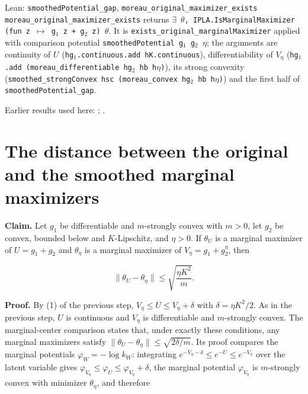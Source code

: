\documentclass[11pt,a4paper]{article}
\begin{document}
\begin{leanbox}{Lean: \texttt{smoothedPotential\_\allowbreak{}gap}, \texttt{moreau\_\allowbreak{}original\_\allowbreak{}maximizer\_\allowbreak{}exists}}
\texttt{moreau\_\allowbreak{}original\_\allowbreak{}maximizer\_\allowbreak{}exists} returns \texttt{\ensuremath{\exists} \ensuremath{\theta}, IPLA.\allowbreak{}Is\allowbreak{}Marginal\allowbreak{}Maximizer (fun z \ensuremath{\mapsto} g\ensuremath{{}_{1}} z + g\ensuremath{{}_{2}} z) \ensuremath{\theta}}. It is \texttt{exists\_\allowbreak{}original\_\allowbreak{}marginal\allowbreak{}Maximizer} applied with comparison potential \texttt{smoothed\allowbreak{}Potential g\ensuremath{{}_{1}} g\ensuremath{{}_{2}} \ensuremath{\eta}}; the arguments are continuity of \(U\) (\texttt{hg\ensuremath{{}_{1}}.\allowbreak{}continuous.\allowbreak{}add h\allowbreak{}K.\allowbreak{}continuous}), differentiability of \(V_\eta\) (\texttt{hg\ensuremath{{}_{1}}.\allowbreak{}add (moreau\_\allowbreak{}differentiable hg\ensuremath{{}_{2}} hb h\ensuremath{\eta})}), its strong convexity (\texttt{smoothed\_\allowbreak{}strong\allowbreak{}Convex hsc (moreau\_\allowbreak{}convex hg\ensuremath{{}_{2}} hb h\ensuremath{\eta})}) and the first half of \texttt{smoothed\allowbreak{}Potential\_\allowbreak{}gap}.
\end{leanbox}


Earlier results used here: \cite[Section~3.1.1]{LangevinLean2026IPLA}; \cite[Section~3.3.1]{LangevinLean2026IPLA}.

\section{\texorpdfstring{The distance between the original and the smoothed marginal maximizers}{The distance between the original and the smoothed marginal maximizers}}


\textbf{Claim.} Let \(g_1\) be differentiable and \(m\)-strongly convex with \(m>0\), let \(g_2\) be convex, bounded below and \(K\)-Lipschitz, and \(\eta>0\). If \(\theta_U\) is a marginal maximizer of \(U=g_1+g_2\) and \(\theta_\eta\) is a marginal maximizer of \(V_\eta=g_1+g_2^\eta\), then


\[\|\theta_U-\theta_\eta\|\le\sqrt{\frac{\eta K^2}{m}} .\]


\textbf{Proof.} By (1) of the previous step, \(V_\eta\le U\le V_\eta+\delta\) with \(\delta=\eta K^2/2\). As in the previous step, \(U\) is continuous and \(V_\eta\) is differentiable and \(m\)-strongly convex. The marginal-center comparison \cite[Section~3.4.4]{LangevinLean2026Proximal} states that, under exactly these conditions, any marginal maximizers satisfy \(\|\theta_U-\theta_\eta\|\le\sqrt{2\delta/m}\). Its proof compares the marginal potentials \(\varphi_W=-\log k_W\): integrating \(e^{-V_\eta-\delta}\le e^{-U}\le e^{-V_\eta}\) over the latent variable gives \(\varphi_{V_\eta}\le\varphi_U\le\varphi_{V_\eta}+\delta\), the marginal potential \(\varphi_{V_\eta}\) is \(m\)-strongly convex with minimizer \(\theta_\eta\), and therefore
\end{document}
